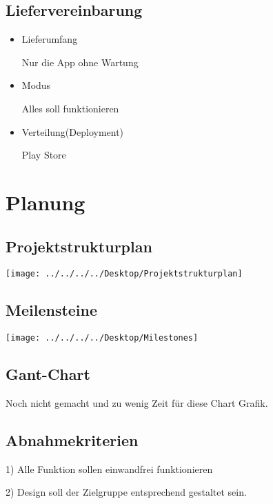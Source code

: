 \subsection{Liefervereinbarung}
\begin{itemize}
	\item Lieferumfang
	
     Nur die App ohne Wartung 
	
	\item Modus
	
	Alles soll funktionieren
	
	
	\item Verteilung(Deployment)
	
	Play Store
	
\end{itemize}
\section{Planung}
\subsection{Projektstrukturplan}

\begin{center}
	\texttt{[image: ../../../../Desktop/Projektstrukturplan]}
\end{center}


\subsection{Meilensteine}

\begin{center}
	\texttt{[image: ../../../../Desktop/Milestones]}
\end{center}


\subsection{Gant-Chart}

Noch nicht gemacht und zu wenig Zeit für diese Chart Grafik.

\subsection{Abnahmekriterien}

1) Alle Funktion sollen einwandfrei funktionieren

2) Design soll der Zielgruppe entsprechend gestaltet sein.


